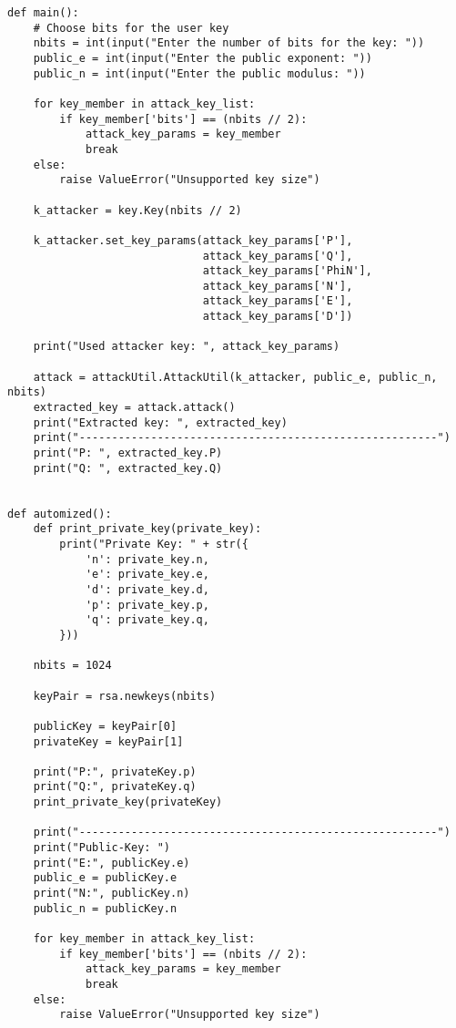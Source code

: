\begin{lstlisting}[language=PyBrIM]
    def main():
    # Choose bits for the user key
    nbits = int(input("Enter the number of bits for the key: "))
    public_e = int(input("Enter the public exponent: "))
    public_n = int(input("Enter the public modulus: "))

    for key_member in attack_key_list:
        if key_member['bits'] == (nbits // 2):
            attack_key_params = key_member
            break
    else:
        raise ValueError("Unsupported key size")

    k_attacker = key.Key(nbits // 2)

    k_attacker.set_key_params(attack_key_params['P'],
                              attack_key_params['Q'],
                              attack_key_params['PhiN'],
                              attack_key_params['N'],
                              attack_key_params['E'],
                              attack_key_params['D'])

    print("Used attacker key: ", attack_key_params)

    attack = attackUtil.AttackUtil(k_attacker, public_e, public_n, nbits)
    extracted_key = attack.attack()
    print("Extracted key: ", extracted_key)
    print("-------------------------------------------------------")
    print("P: ", extracted_key.P)
    print("Q: ", extracted_key.Q)


def automized():
    def print_private_key(private_key):
        print("Private Key: " + str({
            'n': private_key.n,
            'e': private_key.e,
            'd': private_key.d,
            'p': private_key.p,
            'q': private_key.q,
        }))

    nbits = 1024

    keyPair = rsa.newkeys(nbits)

    publicKey = keyPair[0]
    privateKey = keyPair[1]

    print("P:", privateKey.p)
    print("Q:", privateKey.q)
    print_private_key(privateKey)

    print("-------------------------------------------------------")
    print("Public-Key: ")
    print("E:", publicKey.e)
    public_e = publicKey.e
    print("N:", publicKey.n)
    public_n = publicKey.n

    for key_member in attack_key_list:
        if key_member['bits'] == (nbits // 2):
            attack_key_params = key_member
            break
    else:
        raise ValueError("Unsupported key size")


\end{lstlisting}
